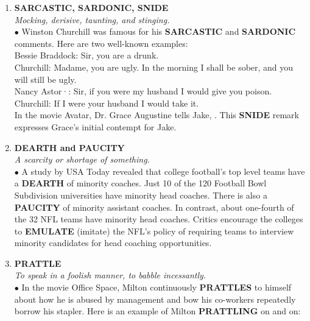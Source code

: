 \documentclass{book}
\begin{document}
\begin{enumerate}
\item \textbf{SARCASTIC, SARDONIC, SNIDE}\\ \textit{Mocking, derisive, taunting, and stinging.}\\

$\bullet$ Winston Churchill was famous for his \textbf{SARCASTIC}
and \textbf{SARDONIC} comments. Here are two well-known
examples:\\
Bessie Braddock: Sir, you are a drunk.\\
Churchill: Madame, you are ugly. In the morning I shall be sober, and you will still be ugly.\\
Nancy Astor·: Sir, if you were my husband I would give you poison.\\
Churchill: If I were your husband I would take it.\\
In the movie Avatar, Dr. Grace Augustine tells Jake,
. This \textbf{SNIDE} remark expresses
Grace's initial contempt for Jake.

\item \textbf{DEARTH and PAUCITY}\\ \textit{A scarcity or shortage of something.}\\

$\bullet$ A study by USA Today revealed that college football's top level teams have a \textbf{DEARTH} of minority coaches. Just 10 of the 120 Football Bowl Subdivision
universities have minority head coaches. There is also
a \textbf{PAUCITY} of minority assistant coaches. In contrast,
about one-fourth of the 32 NFL teams have minority
head coaches. Critics encourage the colleges to
\textbf{EMULATE} (imitate) the NFL's policy of requiring
teams to interview minority candidates for head
coaching opportunities.

\item \textbf{PRATTLE}\\ \textit{To speak in a foolish manner, to babble incessantly.}\\

$\bullet$ In the movie Office Space, Milton continuously
\textbf{PRATTLES} to himself about how he is abused by
management and bow his co-workers repeatedly
borrow his stapler. Here is an example of Milton
\textbf{PRATTLING} on and on:\\


\end{enumerate}
\end{document}
